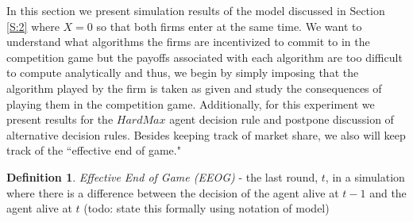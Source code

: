 \documentclass{article}
\theoremstyle{definition}
\newtheorem{definition}{Definition}[section]
\begin{document}
In this section we present simulation results of the model discussed in Section \ref{S:2} where $X = 0$ so that both firms enter at the same time. We want to understand what algorithms the firms are incentivized to commit to in the competition game but the payoffs associated with each algorithm are too difficult to compute analytically and thus, we begin by simply imposing that the algorithm played by the firm is taken as given and study the consequences of playing them in the competition game. Additionally, for this experiment we present results for the $HardMax$ agent decision rule and postpone discussion of alternative decision rules. Besides keeping track of market share, we also will keep track of the ``effective end of game."

\begin{definition}
\textit{Effective End of Game (EEOG)} - the last round, $t$, in a simulation where there is a difference between the decision of the agent alive at $t-1$ and the agent alive at $t$ (todo: state this formally using notation of model)
\end{definition}
\end{document}
